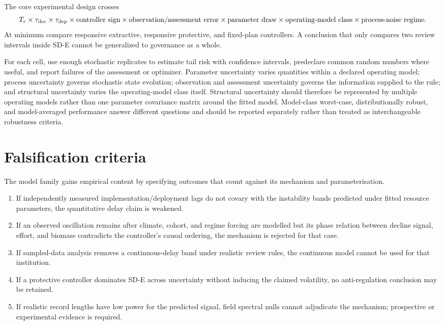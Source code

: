 \documentclass[11pt]{article}
\begin{document}
The core experimental design crosses
\[
T_r\times\tau_{\rm dec}\times\tau_{\rm dep}
\times\text{controller sign}
\times\text{observation/assessment error}
\times\text{parameter draw}
\times\text{operating-model class}
\times\text{process-noise regime}.
\]
At minimum compare responsive extractive, responsive protective, and fixed-plan controllers. A conclusion that only compares two review intervals inside SD-E cannot be generalized to governance as a whole.

For each cell, use enough stochastic replicates to estimate tail risk with confidence intervals, predeclare common random numbers where useful, and report failures of the assessment or optimizer. Parameter uncertainty varies quantities within a declared operating model; process uncertainty governs stochastic state evolution; observation and assessment uncertainty governs the information supplied to the rule; and structural uncertainty varies the operating-model class itself. Structural uncertainty should therefore be represented by multiple operating models rather than one parameter covariance matrix around the fitted model. Model-class worst-case, distributionally robust, and model-averaged performance answer different questions and should be reported separately rather than treated as interchangeable robustness criteria.

\section{Falsification criteria}

The model family gains empirical content by specifying outcomes that count against its mechanism and parameterisation.

\begin{enumerate}
    \item If independently measured implementation/deployment lags do not covary with the instability bands predicted under fitted resource parameters, the quantitative delay claim is weakened.
    \item If an observed oscillation remains after climate, cohort, and regime forcing are modelled but its phase relation between decline signal, effort, and biomass contradicts the controller's causal ordering, the mechanism is rejected for that case.
    \item If sampled-data analysis removes a continuous-delay band under realistic review rules, the continuous model cannot be used for that institution.
    \item If a protective controller dominates SD-E across uncertainty without inducing the claimed volatility, no anti-regulation conclusion may be retained.
    \item If realistic record lengths have low power for the predicted signal, field spectral nulls cannot adjudicate the mechanism; prospective or experimental evidence is required.
\end{enumerate}
\end{document}
